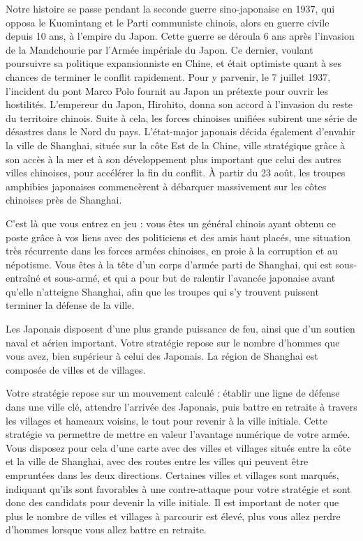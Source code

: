 

\newcommand{\maxa}{123456789}

Notre histoire se passe pendant la seconde guerre sino-japonaise en 1937, qui opposa le Kuomintang et le Parti communiste chinois, alors en guerre civile depuis 10 ans, à l’empire du Japon. Cette guerre se déroula 6 ans après l’invasion de la Mandchourie par l’Armée impériale du Japon. Ce dernier, voulant poursuivre sa politique expansionniste en Chine, et était optimiste quant à ses chances de terminer le conflit rapidement. Pour y parvenir, le 7 juillet 1937, l’incident du pont Marco Polo fournit au Japon un prétexte pour ouvrir les hostilités. L’empereur du Japon, Hirohito, donna son accord à l’invasion du reste du territoire chinois. Suite à cela, les forces chinoises unifiées subirent une série de désastres dans le Nord du pays. L’état-major japonais décida également d’envahir la ville de Shanghai, située sur la côte Est de la Chine, ville stratégique grâce à son accès à la mer et à son développement plus important que celui des autres villes chinoises, pour accélérer la fin du conflit. À partir du 23 août, les troupes amphibies japonaises commencèrent à débarquer massivement sur les côtes chinoises près de Shanghai.

C’est là que vous entrez en jeu : vous êtes un général chinois ayant obtenu ce poste grâce à vos liens avec des politiciens et des amis haut placés, une situation très récurrente dans les forces armées chinoises, en proie à la corruption et au népotisme.
Vous êtes à la tête d’un corps d’armée parti de Shanghai, qui est sous-entraîné et sous-armé, et qui a pour but de ralentir l’avancée japonaise avant qu’elle n’atteigne Shanghai, afin que les troupes qui s’y trouvent puissent terminer la défense de la ville.

Les Japonais disposent d’une plus grande puissance de feu, ainsi que d’un soutien naval et aérien important.
Votre stratégie repose sur le nombre d’hommes que vous avez, bien supérieur à celui des Japonais.
La région de Shanghai est composée de villes et de villages.

Votre stratégie repose sur un mouvement calculé : établir une ligne de défense dans une ville clé, attendre l’arrivée des Japonais, puis battre en retraite à travers les villages et hameaux voisins, le tout pour revenir à la ville initiale.
Cette stratégie va permettre de mettre en valeur l’avantage numérique de votre armée. Vous disposez pour cela d’une carte avec des villes et villages situés entre la côte et la ville de Shanghai, avec des routes entre les villes qui peuvent être empruntées dans les deux directions. Certaines villes et villages sont marqués, indiquant qu’ils sont favorables à une contre-attaque pour votre stratégie et sont donc des candidats pour devenir la ville initiale. Il est important de noter que plus le nombre de villes et villages à parcourir est élevé, plus vous allez perdre d’hommes lorsque vous allez battre en retraite.

